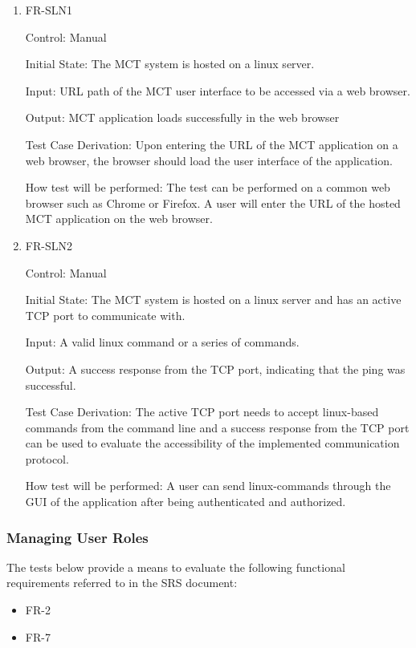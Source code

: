 \documentclass[12pt, titlepage]{article}
\begin{document}
\begin{enumerate}

\item{FR-SLN1\\}

Control: Manual
					
Initial State: The MCT system is hosted on a linux server.
					
Input: URL path of the MCT user interface to be accessed via a web browser.
					
Output: MCT application loads successfully in the web browser

Test Case Derivation: Upon entering the URL of the MCT application on a web browser, the browser should load the user interface of the application.
					
How test will be performed: 
The test can be performed on a common web browser such as Chrome or Firefox. A user will enter the URL of the hosted MCT application on the web browser.

					
\item{FR-SLN2\\}

Control: Manual
					
Initial State: The MCT system is hosted on a linux server and has an active TCP port to communicate with.
					
Input: A valid linux command or a series of commands.
					
Output: A success response from the TCP port, indicating that the ping was successful.

Test Case Derivation: The active TCP port needs to accept linux-based commands from the command line and a success response from the TCP port can be used to evaluate the accessibility of the implemented communication protocol.

How test will be performed: A user can send linux-commands through the GUI of the application after being authenticated and authorized.


\end{enumerate}

\subsubsection{Managing User Roles}

The tests below provide a means to evaluate the following functional requirements referred to in the SRS document:
\begin{itemize}
    \item FR-2
    \item FR-7
\end{itemize}
\end{document}
